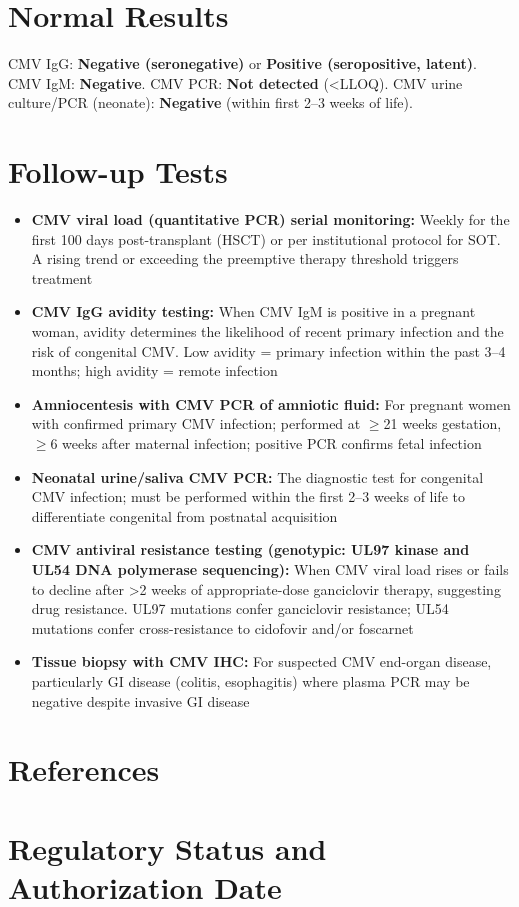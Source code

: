 \section*{Normal Results}
CMV IgG: \textbf{Negative (seronegative)} or \textbf{Positive (seropositive, latent)}. CMV IgM: \textbf{Negative}. CMV PCR: \textbf{Not detected} (<LLOQ). CMV urine culture/PCR (neonate): \textbf{Negative} (within first 2--3 weeks of life).

\section*{Follow-up Tests}
\begin{itemize}
  \item \textbf{CMV viral load (quantitative PCR) serial monitoring:} Weekly for the first 100 days post-transplant (HSCT) or per institutional protocol for SOT. A rising trend or exceeding the preemptive therapy threshold triggers treatment
  \item \textbf{CMV IgG avidity testing:} When CMV IgM is positive in a pregnant woman, avidity determines the likelihood of recent primary infection and the risk of congenital CMV. Low avidity = primary infection within the past 3--4 months; high avidity = remote infection
  \item \textbf{Amniocentesis with CMV PCR of amniotic fluid:} For pregnant women with confirmed primary CMV infection; performed at $\geq$21 weeks gestation, $\geq$6 weeks after maternal infection; positive PCR confirms fetal infection
  \item \textbf{Neonatal urine/saliva CMV PCR:} The diagnostic test for congenital CMV infection; must be performed within the first 2--3 weeks of life to differentiate congenital from postnatal acquisition
  \item \textbf{CMV antiviral resistance testing (genotypic: UL97 kinase and UL54 DNA polymerase sequencing):} When CMV viral load rises or fails to decline after >2 weeks of appropriate-dose ganciclovir therapy, suggesting drug resistance. UL97 mutations confer ganciclovir resistance; UL54 mutations confer cross-resistance to cidofovir and/or foscarnet
  \item \textbf{Tissue biopsy with CMV IHC:} For suspected CMV end-organ disease, particularly GI disease (colitis, esophagitis) where plasma PCR may be negative despite invasive GI disease
\end{itemize}

\section*{References}



\clearpage
\section*{Regulatory Status and Authorization Date}

\clearpage

